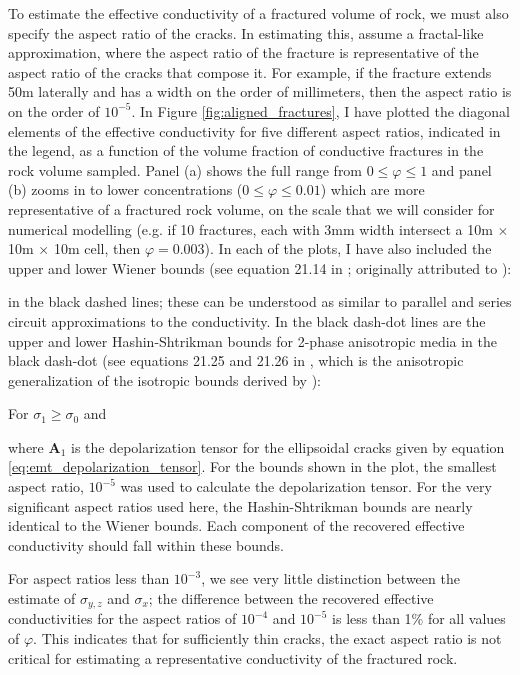 

To estimate the effective conductivity of a fractured volume of rock, we must also specify the aspect ratio of the cracks. In estimating this, assume a fractal-like approximation, where the aspect ratio of the fracture is representative of the aspect ratio of the cracks that compose it. For example, if the fracture extends 50m laterally and has a width on the order of millimeters, then the aspect ratio is on the order of $10^{-5}$. In Figure \ref{fig:aligned_fractures}, I have plotted the diagonal elements of the effective conductivity for five different aspect ratios, indicated in the legend, as a function of the volume fraction of conductive fractures in the rock volume sampled. Panel (a) shows the full range from $0 \leq \varphi \leq 1$ and panel (b) zooms in to lower concentrations ($0 \leq \varphi \leq 0.01$) which are more representative of a fractured rock volume, on the scale that we will consider for numerical modelling (e.g. if 10 fractures, each with 3mm width intersect a 10m $\times$ 10m $\times$ 10m cell, then $\varphi = 0.003$). In each of the plots, I have also included the upper and lower Wiener bounds (see equation 21.14 in \cite{Torquato2002}; originally attributed to \cite{Wiener1912}):

in the black dashed lines; these can be understood as similar to parallel and series circuit approximations to the conductivity. In the black dash-dot lines are the upper and lower Hashin-Shtrikman bounds for 2-phase anisotropic media in the black dash-dot (see equations 21.25 and 21.26 in \cite{Torquato2002}, which is the anisotropic generalization of the isotropic bounds derived by \cite{Hashin1962}):

For $\sigma_1 \geq \sigma_0$ and

where $\mathbf{A}_1$ is the depolarization tensor for the ellipsoidal cracks given by equation \ref{eq:emt_depolarization_tensor}. For the bounds shown in the plot, the smallest aspect ratio, $10^{-5}$ was used to calculate the depolarization tensor. For the very significant aspect ratios used here, the Hashin-Shtrikman bounds are nearly identical to the Wiener bounds. Each component of the recovered effective conductivity should fall within these bounds.



For aspect ratios less than $10^{-3}$, we see very little distinction between the estimate of $\sigma_{y, z}$ and $\sigma_{x}$; the difference between the recovered effective conductivities for the aspect ratios of $10^{-4}$ and $10^{-5}$ is less than 1\% for all values of $\varphi$. This indicates that for sufficiently thin cracks, the exact aspect ratio is not critical for estimating a representative conductivity of the fractured rock.

